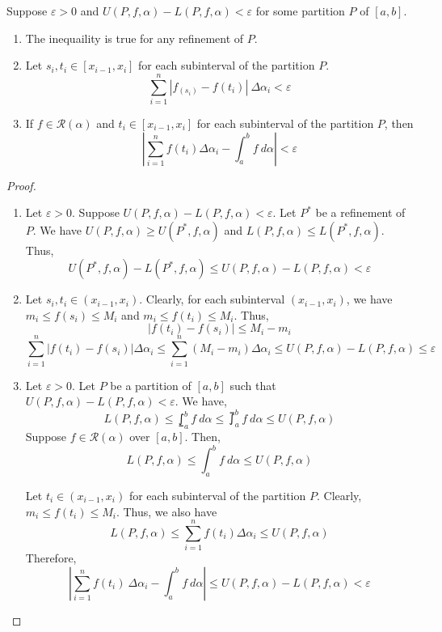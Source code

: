 \begin{theorem}
	Suppose $\varepsilon > 0$ and $U(P,f,\alpha) - L(P,f,\alpha) < \varepsilon$ for some partition $P$ of $[a,b]$.
	\begin{enumerate}
		\item The inequaility is true for any refinement of $P$.
		\item Let $s_i,t_i \in [x_{i-1},x_i]$ for each subinterval of the partition $P$.
			\[ \sum_{i=1}^n \left| f_(s_i)-f(t_i) \right|\ \Delta\alpha_i < \varepsilon \]
		\item If $f \in \mathscr{R}(\alpha)$ and $t_i \in [x_{i-1},x_i]$ for each subinterval of the partition $P$, then
			\[ \left| \sum_{i=1}^n f(t_i) \Delta \alpha_i - \int_a^b f \ d\alpha \right| < \varepsilon \]
	\end{enumerate}
\end{theorem}
\begin{proof}
\begin{enumerate}
	\item Let $\varepsilon > 0$.
		Suppose $U(P,f,\alpha)-L(P,f,\alpha) < \varepsilon$.
		Let $P^\ast$ be a refinement of $P$.
		We have $U(P,f,\alpha) \ge U(P^\ast,f,\alpha)$ and $L(P,f,\alpha) \le L(P^\ast,f,\alpha)$.
		Thus,
		\[ U(P^\ast,f,\alpha)-L(P^\ast,f,\alpha) \le U(P,f,\alpha)-L(P,f,\alpha) < \varepsilon \]
	\item Let $s_i,t_i \in (x_{i-1},x_i)$.
		Clearly, for each subinterval $(x_{i-1},x_i)$, we have $m_i \le f(s_i) \le M_i$ and $m_i \le f(t_i) \le M_i$.
		Thus,
		\[ |f(t_i) - f(s_i)| \le  M_i - m_i \]
		\[ \sum_{i=1}^n |f(t_i) - f(s_i)| \Delta \alpha_i \le \sum_{i=1}^n (M_i - m_i) \Delta \alpha_i \le U(P,f,\alpha)-L(P,f,\alpha) \le \varepsilon \]
	\item Let $\varepsilon > 0$.
		Let $P$ be a partition of $[a,b]$ such that $U(P,f,\alpha) - L(P,f,\alpha) < \varepsilon$.
		We have,
		\[ L(P,f,\alpha) \le \lowint_a^b f\ d\alpha \le \upint_a^b f\ d\alpha \le U(P,f,\alpha) \]
		Suppose $f \in \mathscr{R}(\alpha)$ over $[a,b]$.
		Then, 
		\[ L(P,f,\alpha) \le \int_a^b f\ d\alpha \le U(P,f,\alpha) \] 

		Let $t_i \in (x_{i-1},x_i)$ for each subinterval of the partition $P$.
		Clearly, $m_i \le f(t_i) \le M_i$.
		Thus, we also have
		\[ L(P,f,\alpha) \le \sum_{i=1}^n f(t_i) \Delta \alpha_i \le U(P,f,\alpha) \]
		Therefore, 
		\[ \left| \sum_{i=1}^n f(t_i) \ \Delta \alpha_i - \int_a^b f\ d\alpha \right| \le U(P,f,\alpha) - L(P,f,\alpha) < \varepsilon \]
\end{enumerate}
\end{proof}
